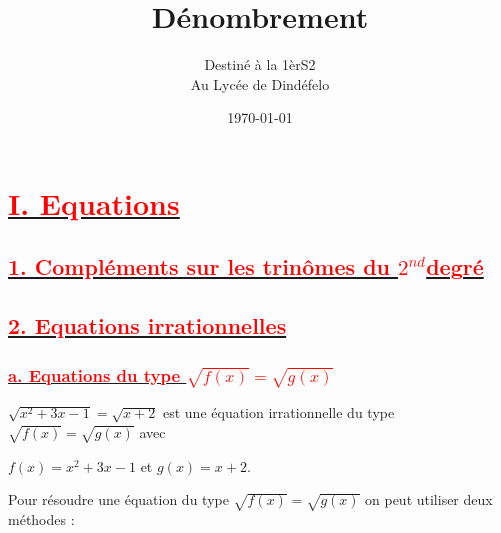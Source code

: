 \documentclass[12pt]{article}
\author{Destiné à la 1èrS2\\Au Lycée de Dindéfelo}
\title{\textbf{Dénombrement}}
\date{\today}
\begin{document}
\maketitle
\newpage
\section*{\underline{\textbf{\textcolor{red}{I. Equations}}}}
\subsection*{\underline{\textbf{\textcolor{red}{1. Compléments sur les trinômes du \( 2^{nd} \)degré}}}}
\subsection*{\underline{\textbf{\textcolor{red}{2. Equations irrationnelles}}}}
\subsubsection*{\underline{\textbf{\textcolor{red}{a. Equations du type \( \sqrt{f(x)} = \sqrt{g(x)} \) }}}}
\( \sqrt{x^{2}+3x-1} = \sqrt{x+2} \) est une équation irrationnelle du type \( \sqrt{f(x)} = \sqrt{g(x)} \) avec 

\( f(x) = x^{2}+3x-1 \) et \( g(x) = x+2 \).

Pour résoudre une équation du type \( \sqrt{f(x)} = \sqrt{g(x)} \) on peut utiliser deux méthodes :
\end{document}
